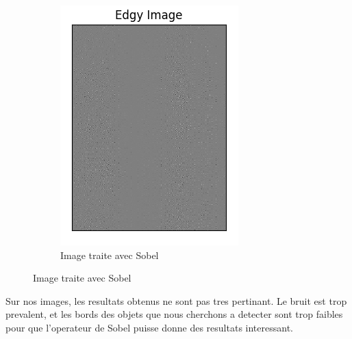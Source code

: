 \documentclass[a4paper, 12pt, titlepage, oneside]{article}
\begin{document}
\begin{figure}[!h]
\begin{subfigure}[b]{0.4\linewidth}
			\includegraphics[width=\linewidth]{Sobel1a.png}
			\caption{Image traite avec Sobel}
		\end{subfigure}
		\label{fig:OurSobel}
	\end{figure}

	Sur nos images, les resultats obtenus ne sont pas tres pertinant. Le bruit est trop prevalent, et les bords des objets que nous cherchons a detecter sont trop faibles pour que l'operateur de Sobel puisse donne des resultats interessant.
\end{document}
